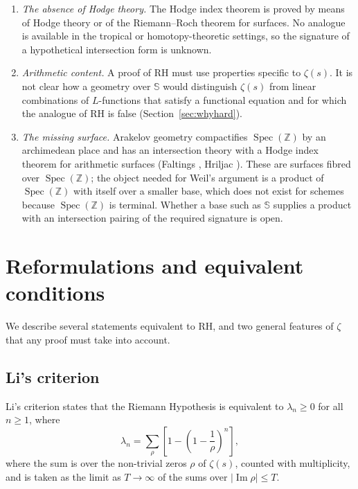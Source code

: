 \documentclass[11pt]{amsart}
\theoremstyle{definition}
\theoremstyle{remark}
\begin{document}
\begin{enumerate}[label=(\roman*)]
\item \emph{The absence of Hodge theory.} The Hodge index theorem is proved by means of Hodge theory or of the Riemann--Roch theorem for surfaces. No analogue is available in the tropical or homotopy-theoretic settings, so the signature of a hypothetical intersection form is unknown.
\item \emph{Arithmetic content.} A proof of RH must use properties specific to $\zeta(s)$. It is not clear how a geometry over $\mathbb{S}$ would distinguish $\zeta(s)$ from linear combinations of $L$-functions that satisfy a functional equation and for which the analogue of RH is false (Section~\ref{sec:whyhard}).
\item \emph{The missing surface.} Arakelov geometry compactifies $\operatorname{Spec}(\mathbb{Z})$ by an archimedean place and has an intersection theory with a Hodge index theorem for arithmetic surfaces (Faltings \cite{faltings1984}, Hriljac \cite{hriljac1985}). These are surfaces fibred over $\operatorname{Spec}(\mathbb{Z})$; the object needed for Weil's argument is a product of $\operatorname{Spec}(\mathbb{Z})$ with itself over a smaller base, which does not exist for schemes because $\operatorname{Spec}(\mathbb{Z})$ is terminal. Whether a base such as $\mathbb{S}$ supplies a product with an intersection pairing of the required signature is open.
\end{enumerate}

\section{Reformulations and equivalent conditions}\label{sec:equiv}

We describe several statements equivalent to RH, and two general features of $\zeta$ that any proof must take into account.

\subsection{Li's criterion}\label{sec:li}

Li's criterion \cite{li1997} states that the Riemann Hypothesis is equivalent to $\lambda_n\ge0$ for all $n\ge1$, where
\begin{equation}\label{eq:li}
\lambda_n = \sum_{\rho} \left[ 1 - \left(1 - \frac{1}{\rho}\right)^{\!n} \right],
\end{equation}
where the sum is over the non-trivial zeros $\rho$ of $\zeta(s)$, counted with multiplicity, and is taken as the limit as $T\to\infty$ of the sums over $|\operatorname{Im}\rho|\le T$.
\end{document}

